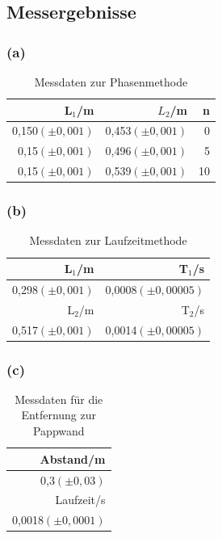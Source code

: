 \documentclass[12pt]{scrartcl}
\begin{document}
\subsection{Messergebnisse}
\subsubsection{(a)}

\begin{table}[H]
\caption{Messdaten zur Phasenmethode}
\begin{center}
\begin{tabular}{|r|r|r|}
\hline
L$_1$/m & $L_2$/m & n \\ \hline
0,150$(\pm 0,001)$ & 0,453$(\pm 0,001)$ & 0 \\ \hline
0,15$(\pm 0,001)$ & 0,496$(\pm 0,001)$ & 5 \\ \hline
0,15$(\pm 0,001)$ & 0,539$(\pm 0,001)$ & 10 \\ \hline
\end{tabular}
\end{center}
\label{tab:aufgabe2_a}
\end{table}

\subsubsection{(b)}

\begin{table}[H]
\caption{Messdaten zur Laufzeitmethode}
\begin{center}
\begin{tabular}{|r|r|}
\hline
L$_1$/m & T$_1$/s \\ \hline
0,298$(\pm 0,001)$ & 0,0008$(\pm 0,00005)$ \\ \hline
L$_2$/m & T$_2$/s \\ \hline
0,517$(\pm 0,001)$ & 0,0014$(\pm 0,00005)$ \\ \hline
\end{tabular}
\end{center}
\label{tab:aufgabe2_b}
\end{table}

\subsubsection{(c)}

\begin{table}[H]
\caption{Messdaten für die Entfernung zur Pappwand}
\begin{center}
\begin{tabular}{|r|}
\hline
Abstand/m \\ \hline
0,3$(\pm 0,03)$ \\ \hline
Laufzeit/s \\ \hline
0,0018$(\pm 0,0001)$ \\ \hline
\end{tabular}
\end{center}
\label{tab:aufgabe2_c}
\end{table}
\end{document}
